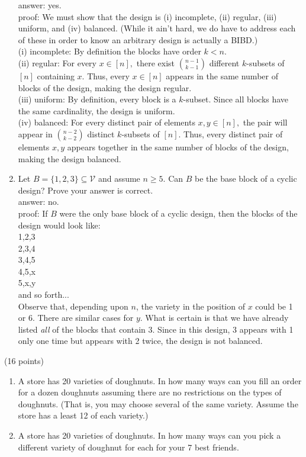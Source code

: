 \documentclass[11pt]{article}
\def\be{\begin{enumerate}}
\def\ee{\end{enumerate}}
\renewcommand{\d}{\displaystyle}
\begin{document}
\begin{enumerate}
	answer: yes.\\
	proof: We must show that the design is (i) incomplete, (ii) regular, (iii) uniform, and (iv) balanced. (While it ain't hard, we do have to address each of these in order to know an arbitrary design is actually a BIBD.)\\
	(i) incomplete: By definition the blocks have order $k <n.$\\
	(ii) regular: For every $x \in [n],$ there exist $\d {n-1 \choose k-1}$ different $k$-subsets of $[n]$ containing $x.$ Thus, every $x \in [n]$ appears in the same number of blocks of the design, making the design regular.\\
	(iii) uniform: By definition, every block is a $k$-subset. Since all blocks have the same cardinality, the design is uniform.\\
	(iv) balanced: For every distinct pair of elements $x,y \in [n],$ the pair will appear in $\d {n-2 \choose k-2}$ distinct $k$-subsets of $[n].$ Thus, every distinct pair of elements $x,y$ appears together in the same number of blocks of the design, making the design balanced.\\
	
	\item Let $B=\{1,2,3\} \subseteq \mathcal{V}$ and assume $n \geq 5.$ Can $B$ be the base block of a cyclic design? Prove your answer is correct.\\
	
	answer: no.\\
	proof: If $B$ were the only base block of a cyclic design, then the blocks of the design would look like:\\
	1,2,3\\
	2,3,4\\
	3,4,5\\
	4,5,x\\
	5,x,y\\
	and so forth...\\
	
	Observe that, depending upon $n$, the variety in the position of $x$ could be 1 or 6. There are similar cases for $y.$ What is certain is that we have already listed \emph{all} of the blocks that contain $3$. Since in this design, 3 appears with 1 only one time but appears with 2 twice, the design is not balanced.\\

	\ee

\vfill
\newpage
\item (16 points) 
	\be
	\item A store has 20 varieties of doughnuts. In how many ways can you fill an order for a dozen doughnuts assuming there are no restrictions on the types of doughnuts. (That is, you may choose several of the same variety. Assume the store has a least 12 of each variety.)
	\vfill
	\item A store has 20 varieties of doughnuts. In how many ways can you pick a different variety of doughnut for each for your 7 best friends.
	\vfill
	

\end{enumerate}
\end{document}
